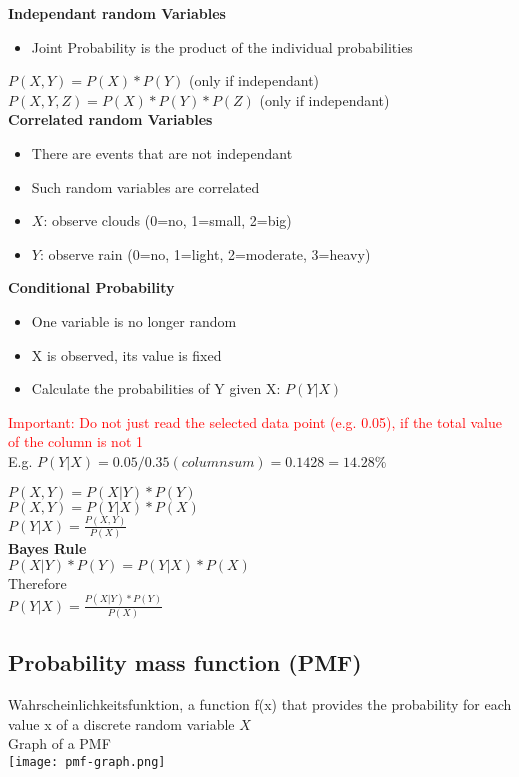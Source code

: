 \textbf{Independant random Variables}
\begin{itemize}
    \item Joint Probability is the product of the individual probabilities
\end{itemize}
$P(X,Y) = P(X) * P(Y)$ (only if independant)\\
$P(X,Y,Z) = P(X) * P(Y) * P(Z)$ (only if independant)\\
\textbf{Correlated random Variables}
\begin{itemize}
    \item There are events that are not independant
    \item Such random variables are correlated
    \item $X$: observe clouds (0=no, 1=small, 2=big)
    \item $Y$: observe rain (0=no, 1=light, 2=moderate, 3=heavy)
\end{itemize}
\textbf{Conditional Probability}
\begin{itemize}
    \item One variable is no longer random
    \item X is observed, its value is fixed
    \item Calculate the probabilities of Y given X: $P(Y | X)$
\end{itemize}

\textcolor{red}{Important: Do not just read the selected data point (e.g. 0.05), if the total value of the column is not 1}\\
E.g. $P(Y | X) = 0.05 / 0.35 (column sum) = 0.1428 = 14.28\%$

$P(X, Y) = P(X | Y) * P(Y)$\\
$P(X, Y) = P(Y | X) * P(X)$\\
$P(Y | X) = \frac{P(X,Y)}{P(X)}$\\
\textbf{Bayes Rule}\\
$P(X|Y)*P(Y) = P(Y|X)*P(X)$\\
Therefore\\
$P(Y|X) = \frac{P(X|Y)*P(Y)}{P(X)}$


\subsection{Probability mass function (PMF)}
Wahrscheinlichkeitsfunktion, a function f(x) that provides the probability for each value x of a discrete random
variable $X$ \\

Graph of a PMF \\
\texttt{[image: pmf-graph.png]} \\
